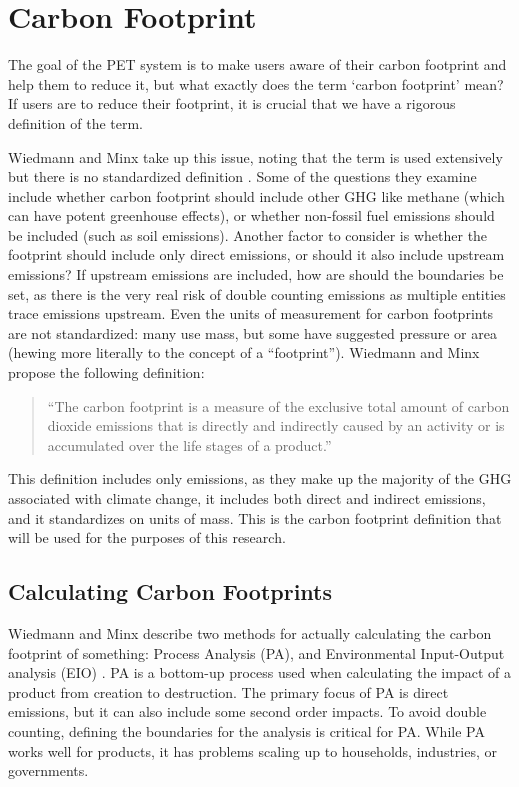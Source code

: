 \section{Carbon Footprint}
\label{sec:carbon-footprint}

The goal of the PET system is to make users aware of their carbon footprint and help them to reduce it, but what exactly does the term `carbon footprint' mean? If users are to reduce their footprint, it is crucial that we have a rigorous definition of the term.

Wiedmann and Minx take up this issue, noting that the term is used extensively but there is no standardized definition \cite{Wiedmann2007carbon-footprint}. Some of the questions they examine include whether carbon footprint should include other GHG like methane (which can have potent greenhouse effects), or whether non-fossil fuel emissions should be included (such as soil emissions). Another factor to consider is whether the footprint should include only direct emissions, or should it also include upstream emissions? If upstream emissions are included, how are should the boundaries be set, as there is the very real risk of double counting emissions as multiple entities trace emissions upstream. Even the units of measurement for carbon footprints are not standardized: many use mass, but some have suggested pressure or area (hewing more literally to the concept of a ``footprint''). Wiedmann and Minx propose the following definition:

\begin{quote}
``The carbon footprint is a measure of the exclusive total amount of carbon dioxide emissions that is directly and indirectly caused by an activity or is accumulated over the life stages of a product.''
\end{quote}

This definition includes only \COtwo emissions, as they make up the majority of the GHG associated with climate change, it includes both direct and indirect emissions, and it standardizes on units of mass. This is the carbon footprint definition that will be used for the purposes of this research.

\subsection{Calculating Carbon Footprints}

Wiedmann and Minx describe two methods for actually calculating the carbon footprint of something: Process Analysis (PA), and Environmental Input-Output analysis (EIO) \cite{Wiedmann2007carbon-footprint}. PA is a bottom-up process used when calculating the impact of a product from creation to destruction. The primary focus of PA is direct emissions, but it can also include some second order impacts. To avoid double counting, defining the boundaries for the analysis is critical for PA. While PA works well for products, it has problems scaling up to households, industries, or governments. 

